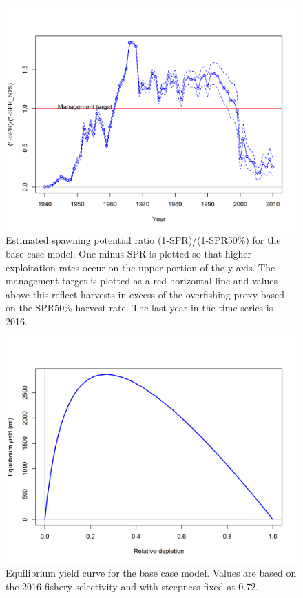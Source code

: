 \documentclass[12pt,]{article}
\begin{document}
\FloatBarrier

\begin{figure}
\centering
\includegraphics{r4ss/plots_mod1/SPR3_ratiointerval.png}
\caption{Estimated spawning potential ratio (1-SPR)/(1-SPR50\%) for the
base-case model. One minus SPR is plotted so that higher exploitation
rates occur on the upper portion of the y-axis. The management target is
plotted as a red horizontal line and values above this reflect harvests
in excess of the overfishing proxy based on the SPR50\% harvest rate.
The last year in the time series is 2016. \label{fig:SPR}}
\end{figure}

\FloatBarrier

\begin{figure}
\centering
\includegraphics{r4ss/plots_mod1/yield1_yield_curve.png}
\caption{Equilibrium yield curve for the base case model. Values are
based on the 2016 fishery selectivity and with steepness fixed at 0.72.
\label{fig:yield}}
\end{figure}
\end{document}
